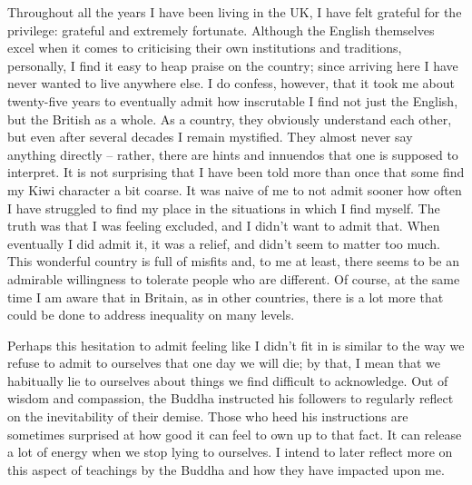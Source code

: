 Throughout all the years I have been living in the UK, I have felt
grateful for the privilege: grateful and extremely fortunate. Although
the English themselves excel when it comes to criticising their own
institutions and traditions, personally, I find it easy to heap praise
on the country; since arriving here I have never wanted to live anywhere
else. I do confess, however, that it took me about twenty-five years to
eventually admit how inscrutable I find not just the English, but the
British as a whole. As a country, they obviously understand each other,
but even after several decades I remain mystified. They almost never say
anything directly -- rather, there are hints and innuendos that one is
supposed to interpret. It is not surprising that I have been told more
than once that some find my Kiwi character a bit coarse. It was naive of
me to not admit sooner how often I have struggled to find my place in the
situations in which I find myself. The truth was that I was feeling
excluded, and I didn't want to admit that. When eventually I did admit
it, it was a relief, and didn't seem to matter too much. This wonderful
country is full of misfits and, to me at least, there seems to be an
admirable willingness to tolerate people who are different. Of course,
at the same time I am aware that in Britain, as in other countries,
there is a lot more that could be done to address inequality on many
levels.

Perhaps this hesitation to admit feeling like I didn't fit in is similar
to the way we refuse to admit to ourselves that one day we will die; by
that, I mean that we habitually lie to ourselves about things we find
difficult to acknowledge. Out of wisdom and compassion, the Buddha
instructed his followers to regularly reflect on the inevitability of
their demise. Those who heed his instructions are sometimes surprised at
how good it can feel to own up to that fact. It can release a lot of
energy when we stop lying to ourselves. I intend to later reflect more
on this aspect of teachings by the Buddha and how they have impacted
upon me.


